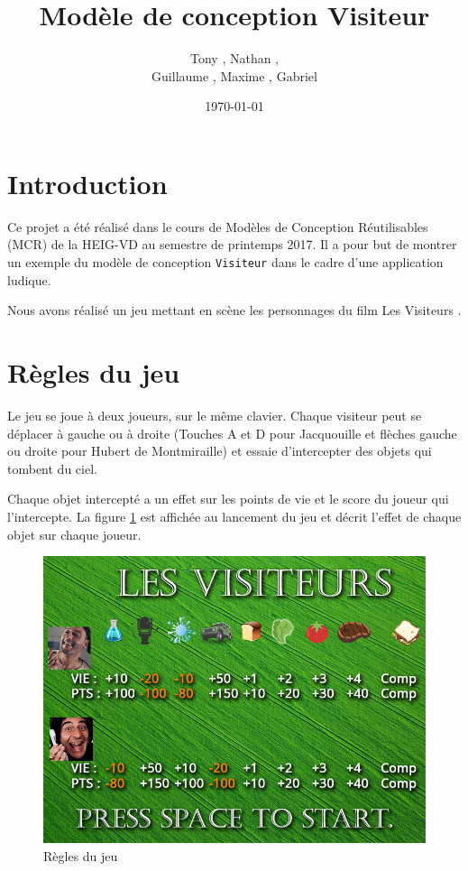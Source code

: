 \documentclass[11pt,a4paper,twoside]{article}
\title{\huge\bfseries Modèle de conception Visiteur}
\author{Tony \bsc{Clavien}, Nathan \bsc{Gonzalez Montes}, \\ Guillaume \bsc{Milani}, Maxime \bsc{Guillod}, Gabriel \bsc{Luthier}}
\date{\today}
\begin{document}
\maketitle
%
\section*{Introduction}
Ce projet a été réalisé dans le cours de Modèles de Conception Réutilisables (MCR) de la HEIG-VD au semestre de printemps 2017. Il a pour but de montrer un exemple du modèle de conception \texttt{Visiteur} dans le cadre d'une application ludique.

Nous avons réalisé un jeu mettant en scène les personnages du film \og Les Visiteurs \fg.

\section*{Règles du jeu}
Le jeu se joue à deux joueurs, sur le même clavier. Chaque visiteur peut se déplacer à gauche ou à droite (Touches A et D pour Jacquouille et flèches gauche ou droite pour Hubert de Montmiraille) et essaie d'intercepter des objets qui tombent du ciel.

Chaque objet intercepté a un effet sur les points de vie et le score du joueur qui l'intercepte. La figure \ref{regles} est affichée au lancement du jeu et décrit l'effet de chaque objet sur chaque joueur.
\begin{figure}[!ht]
	\center
	\includegraphics[scale=0.48]{../Game/src/resources/images/regles}
	\caption{Règles du jeu}
	\label{regles}
\end{figure}
\end{document}

